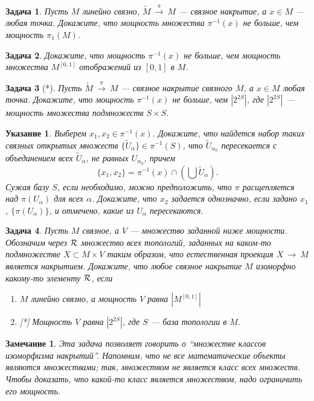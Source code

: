 \documentclass[12pt]{book}
\newcommand{\arrow}{{\:\longrightarrow\:}}
\theoremstyle{upshape}
\newtheorem{zadacha}{Задача}[chapter]
\theoremstyle{generic}
\theoremstyle{upshapenonumber}
\newtheorem{ukazanie}{Указание}[section]
\newtheorem{zamechanie}{Замечание}[chapter]
\newcommand{\следствие}{%
     \refstepcounter{teorema}
     {\noindent\bf Следствие \thechapter.\arabic{teorema}:\ }}
\newcommand{\пример}{%
     \refstepcounter{teorema}
     {\noindent\bf Пример \thechapter.\arabic{teorema}:\ }}
\newcommand{\лемма}{%
     \refstepcounter{teorema}
     {\noindent\bf Лемма \thechapter.\arabic{teorema}:\ }}
\newcommand{\теорема}{%
     \refstepcounter{teorema}
     {\noindent\bf Теорема \thechapter.\arabic{teorema}:\ }}
\newcommand{\утверждение}{%
     \refstepcounter{teorema}
     {\noindent\bf Утверждение \thechapter.\arabic{teorema}:\ }}
\def\ит{\it}
\def\итем{\item %
}
\begin{document}
{\begin{zadacha}
Пусть $M$ линейно связно, 
$\tilde M \overset{\pi}{\arrow} M$ --- связное накрытие, а 
$x\in M$ --- любая точка. 
Докажите, что мощность множества $\pi^{-1}(x)$ 
не больше, чем мощность $\pi_1(M)$.
\end{zadacha}

\begin{zadacha}
Докажите, что 
мощность $\pi^{-1}(x)$  не больше, чем 
мощность множества $M^{[0,1]}$ отображений из $[0,1]$ в $M$.
\end{zadacha}


\begin{zadacha}[*]
Пусть $\tilde M \overset{\pi}{\arrow} M$ --- связное
накрытие связного $M$, а $x\in M$ любая точка. 
Докажите, что
мощность $\pi^{-1}(x)$ не больше, чем
$|2^{2S}|$, где $|2^{2S}|$ --- мощность множества
подмножеств $S\times S$.
\end{zadacha}

\begin{ukazanie}
Выберем $x_1, x_2\in \pi^{-1}(x)$. Докажите, что
найдется набор таких связных открытых множеств $\{\tilde U_\alpha\}\in \pi^{-1}(S)$,
что $\tilde U_{\alpha_0}$ пересекается с объединением
всех $\tilde U_\alpha$, не равных $U_{\alpha_0}$, причем
\[ \{x_1 ,x_2\}= \pi^{-1}(x)\cap \left(\bigcup \tilde U_\alpha\right).\]
Сужая базу $S$, если необходимо, можно предположить,
что $\pi$ расщепляется над  $\pi(U_\alpha)$ для всех
$\alpha$. Докажите, что $x_2$ задается однозначно,
если задано $x_1$, $\{\pi(U_\alpha)\}$, и отмечено,
какие из $U_{\alpha}$ пересекаются.
\end{ukazanie}

\begin{zadacha} 
Пусть $M$ связное, а $V$ --- множество заданной ниже мощности.
Обозначим через ${\cal R}$ множество всех топологий,
заданных на каком-то подмножестве 
$X\subset M \times V$ таким образом, что 
естественная проекция $X\arrow M$
является накрытием. Докажите, что
любое связное накрытие $M$ изоморфно какому-то
элементу ${\cal R}$, если
\begin{enumerate}
\итем $M$ линейно связно, а мощность $V$ 
равна $|M^{[0,1]}|$

\итем[*] Мощность 
$V$ равна $|2^{2S}|$, где $S$ --- база топологии в $M$.
\end{enumerate}
\end{zadacha}

\begin{zamechanie}
Эта задача позволяет говорить о ``множестве классов
изоморфизма накрытий''. Напомним, что не все
математические объекты являются множествами; так,
множеством не является класс всех множеств.
Чтобы доказать, что какой-то класс является
множеством, надо ограничить его мощность.
\end{zamechanie}

}
\end{document}
